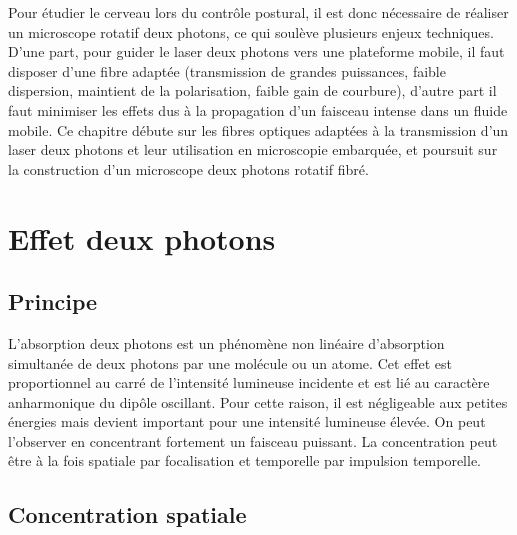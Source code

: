 
Pour étudier le cerveau lors du contrôle postural, il est donc nécessaire de réaliser un microscope rotatif deux photons, ce qui soulève plusieurs enjeux techniques. D'une part, pour guider le laser deux photons vers une plateforme mobile, il faut disposer d'une fibre adaptée (transmission de grandes puissances, faible dispersion, maintient de la polarisation, faible gain de courbure), d'autre part il faut minimiser les effets dus à la propagation d'un faisceau intense dans un fluide mobile. Ce chapitre débute sur les fibres optiques adaptées à la transmission d'un laser deux photons et leur utilisation en microscopie embarquée, et poursuit sur la construction d'un microscope deux photons rotatif fibré.



\section{Effet deux photons}

\subsection{Principe}

L'absorption deux photons est un phénomène non linéaire d'absorption simultanée de deux photons par une molécule ou un atome. Cet effet est proportionnel au carré de l'intensité lumineuse incidente et est lié au caractère anharmonique du dipôle oscillant. Pour cette raison, il est négligeable aux petites énergies mais devient important pour une intensité lumineuse élevée. On peut l'observer en concentrant fortement un faisceau puissant. La concentration peut être à la fois spatiale par focalisation et temporelle par impulsion temporelle.

\subsection{Concentration spatiale}

